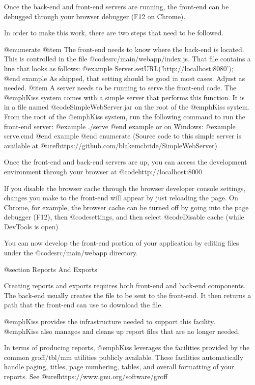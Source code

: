 Once the back-end and front-end servers are running, the front-end can
be debugged through your browser debugger (F12 on Chrome).

In order to make this work, there are two steps that
need to be followed.

@enumerate
@item
The front-end needs to know where the back-end is located.  This is
controlled in the file @code{src/main/webapp/index.js}.  That file
contains a line that looks as follows:
@example
    Server.setURL('http://localhost:8080');
@end example
As shipped, that setting should be good in most cases.  Adjust as needed.
@item
A server needs to be running to serve the front-end code.  The
@emph{Kiss} system comes with a simple server that performs this
function.  It is in a file named @code{SimpleWebServer.jar} on the
root of the @emph{Kiss} system.  From the root of the @emph{Kiss}
system, run the following command to run the front-end server:
@example
   ./serve
@end example
or on Windows:
@example
   serve.cmd
@end example
@end enumerate
(Source code to this simple server is available at 
@uref{https://github.com/blakemcbride/SimpleWebServer})

Once the front-end and back-end servers are up, you can access the development
environment through your browser at @code{http://localhost:8000}

If you disable the browser cache through the browser developer console
settings, changes you make to the front-end will appear by just
reloading the page.  On Chrome, for example, the browser cache can be
turned off by going into the page debugger (F12), then
@code{settings}, and then select @code{Disable cache (while DevTools
is open)}

You can now develop the front-end portion of your application by
editing files under the @code{src/main/webapp} directory.

@section Reports And Exports

Creating reports and exports requires both front-end and back-end components.
The back-end usually creates the file to be sent to the front-end.  It then returns
a path that the front-end can use to download the file.

@emph{Kiss} provides the infrastructure needed to support this facility.
@emph{Kiss} also manages and cleans up report files that are no longer needed.

In terms of producing reports, @emph{Kiss} leverages the facilities
provided by the common groff/tbl/mm utilities publicly available.
These facilities automatically handle paging, titles, page numbering,
tables, and overall formatting of your reports. See
@uref{https://www.gnu.org/software/groff}

